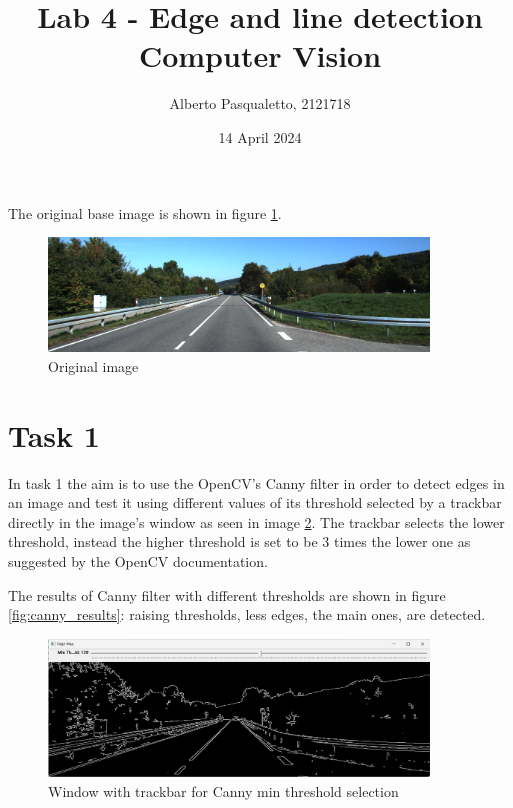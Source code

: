\documentclass{article}
\title{Lab 4 - Edge and line detection\\
	\large{Computer Vision}}
\author{Alberto Pasqualetto, 2121718}
\date{14 April 2024}
\begin{document}
\maketitle

The original base image is shown in figure \ref{fig:original}.
\begin{figure}[H]
	\centering
	\includegraphics[width=0.9\textwidth]{../street_scene.png}
	\caption{Original image}
	\label{fig:original}
\end{figure}

\section*{Task 1}
In task 1 the aim is to use the OpenCV's Canny filter in order to detect edges in an image and test it using different values of its threshold selected by a trackbar directly in the image's window as seen in image \ref{fig:canny_trackbar}. The trackbar selects the lower threshold, instead the higher threshold is set to be 3 times the lower one as suggested by the OpenCV documentation.

The results of Canny filter with different thresholds are shown in figure \ref{fig:canny_results}: raising thresholds, less edges, the main ones, are detected.

\begin{figure}[H]
	\centering
	\includegraphics[width=0.9\textwidth]{street_scene_cannyTrackbarWindow.png}
	\caption{Window with trackbar for Canny min threshold selection}
	\label{fig:canny_trackbar}
\end{figure}
\end{document}
